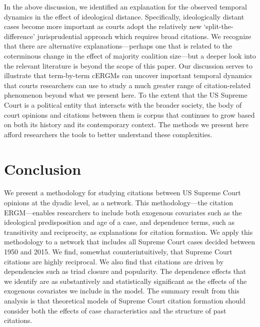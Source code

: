 \documentclass{cup-pan}
\begin{document}
In the above discussion, we identified an explanation for the observed temporal dynamics in the effect of ideological distance. Specifically, ideologically distant cases become more important as courts adopt the relatively new `split-the-difference' jurisprudential approach which requires broad citations. We recognize that there are alternative explanations---perhaps one that is related to the coterminous change in the effect of majority coalition size---but a deeper look into the relevant literature is beyond the scope of this paper. Our discussion serves to illustrate that term-by-term cERGMs can uncover important temporal dynamics that courts researchers can use to study a much greater range of citation-related phenomenon beyond what we present here. To the extent that the US Supreme Court is a political entity that interacts with the broader society, the body of court opinions and citations between them is corpus that continues to grow based on both its history and its contemporary context. The methods we present here afford researchers the tools to better understand these complexities.






\section{Conclusion}

We present a methodology for studying citations between US Supreme Court opinions at the dyadic level, as a network. This methodology---the citation ERGM---enables researchers to include both exogenous covariates such as the ideological predisposition and age of a case, and dependence terms, such as transitivity and reciprocity, as explanations for citation formation. We apply this methodology to a network that includes all Supreme Court cases decided between 1950 and 2015. We find, somewhat counterintuitively, that Supreme Court citations are highly reciprocal. We also find that citations are driven by dependencies such as triad closure and popularity. The dependence effects that we identify are as substantively and statistically significant as the effects of the exogenous covariates we include in the model. The summary result from this analysis is that theoretical models of Supreme Court citation formation should consider both the effects of case characteristics and the structure of past citations. 
\end{document}
